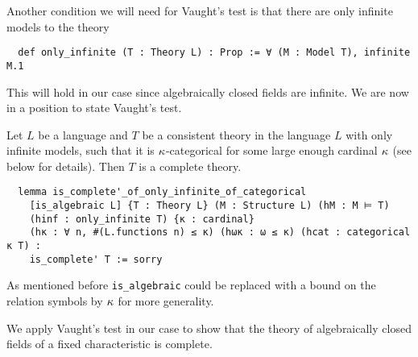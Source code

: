 Another condition we will need for Vaught's test
is that there are only infinite models to the theory

\begin{lstlisting}
  def only_infinite (T : Theory L) : Prop := ∀ (M : Model T), infinite M.1\end{lstlisting}

This will hold in our case since algebraically closed fields are infinite.
We are now in a position to state Vaught's test.

\begin{prop}
  Let $L$ be a language and $T$ be a consistent theory in the language $L$
  with only infinite models, such that it is $\kappa$-categorical
  for some large enough cardinal $\kappa$ (see below for details).
  Then $T$ is a complete theory.

  \begin{lstlisting}
  lemma is_complete'_of_only_infinite_of_categorical
    [is_algebraic L] {T : Theory L} (M : Structure L) (hM : M ⊨ T)
    (hinf : only_infinite T) {κ : cardinal}
    (hκ : ∀ n, #(L.functions n) ≤ κ) (hωκ : ω ≤ κ) (hcat : categorical κ T) :
    is_complete' T := sorry
\end{lstlisting}
\end{prop}
As mentioned before \texttt{is\_algebraic} could be replaced with a
bound on the relation symbols by $\kappa$ for more generality.

We apply Vaught's test in our case to show that the theory
of algebraically closed fields of a fixed characteristic is complete.

